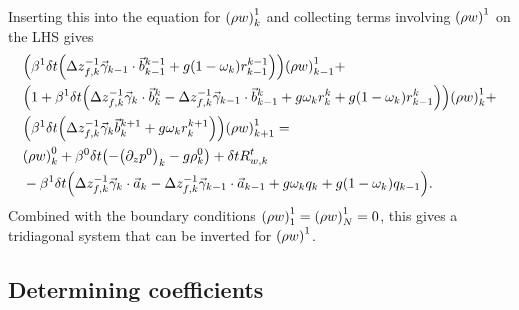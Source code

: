 \documentclass[11pt]{article}
\begin{document}
Inserting this into the equation for $\qty(\rho w)^1_k$ and collecting terms involving $\qty(\rho w)^1$ on the LHS gives
\begin{align*}
& \qty(\beta^1 \delta t \qty(\Delta z_{f,k}^{-1} \vec{\gamma}_{k-1} \cdot \vec{b}^{k-1}_{k-1} + g \qty(1 - \omega_k) r^{k-1}_{k-1}))\qty(\rho w)^1_{k-1} + \\
& \qty(1 + \beta^1 \delta t \qty(\Delta z_{f,k}^{-1} \vec{\gamma}_k \cdot \vec{b}^k_k - \Delta z_{f,k}^{-1} \vec{\gamma}_{k-1} \cdot \vec{b}_{k-1}^k + g \omega_k r^k_k + g \qty(1 - \omega_k) r^k_{k-1} )) \qty(\rho w)^1_k + \\
& \qty(\beta^1 \delta t \qty(\Delta z_{f,k}^{-1} \vec{\gamma}_k \vec{b}^{k+1}_k + g \omega_k r^{k+1}_k)) \qty(\rho w)^1_{k+1} = \\
& \qty(\rho w)^0_k + \beta^0 \delta t \qty(-\qty(\partial_z p^0)_k - g \rho^0_k) + \delta t R_{w,k}^t \\
&- \beta^1 \delta t \qty(\Delta z_{f,k}^{-1} \vec{\gamma}_k \cdot \vec{a}_k - \Delta z_{f,k}^{-1} \vec{\gamma}_{k-1} \cdot \vec{a}_{k-1} + g \omega_k q_k + g \qty(1 - \omega_k) q_{k-1}).
\end{align*}
Combined with the boundary conditions $\qty(\rho w)^1_1 = \qty(\rho w)^1_N = 0$, this gives a tridiagonal system that can be inverted for $\qty(\rho w)^1$.

\subsection{Determining coefficients}
\end{document}
